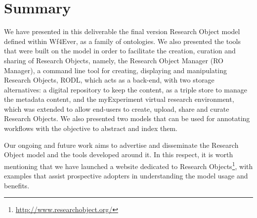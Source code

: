 \section{Summary}
\label{sec:conclusions}

We have presented in this deliverable the final version Research Object model defined within Wf4Ever, as a family of ontologies. We also presented the tools that were built on the model in order to facilitate the creation, curation and sharing of Research Objects, namely, the Research Object Manager (RO Manager), a command line tool for creating, displaying and manipulating Research Objects, RODL, which acts as a back-end, with two storage alternatives: a digital repository to keep the content, as a triple store to manage the metadata content, and the myExperiment virtual research environment, which was extended to allow end-users to create, upload, share and curate Research Objects. We also presented two models that can be used for annotating workflows with the objective to abstract and index them.

Our ongoing and future work aims to advertise and disseminate the Research Object model and the tools developed around it. In this respect, it is worth mentioning that we have launched a website dedicated to Research Objects\footnote{\url{http://www.researchobject.org/}}, with examples that assist prospective adopters in understanding the model usage and benefits.
